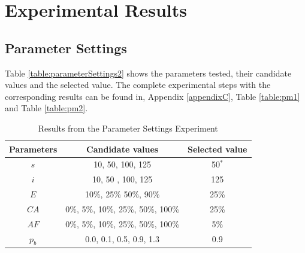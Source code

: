 \section{Experimental Results}
\label{sec:expResults}

\subsection{Parameter Settings}
\label{subsec:parameterSettings_results}

Table \vref{table:parameterSettings2} shows the parameters tested, their candidate values and the selected value. The complete experimental steps with the corresponding results can be found in, Appendix \ref{appendixC}, Table \vref{table:pm1} and Table \vref{table:pm2}. 

    \begin{table}[H]
    \centering
    \begin{tabular}{|c|c||c|}
    \hline
    Parameters & Candidate values & Selected value\\
    \hline
    $s$ & 10, 50, 100, 125 & 50$^*$ \\
    $i$ & 10, 50 , 100, 125 & 125\\
    $E$ & 10\%, 25\% 50\%, 90\% & 25\% \\
    $CA$ & 0\%, 5\%, 10\%, 25\%, 50\%, 100\% & 25\% \\
    $AF$ & 0\%, 5\%, 10\%, 25\%, 50\%, 100\% & 5\% \\
    $p_{b}$ & 0.0, 0.1, 0.5, 0.9, 1.3 & 0.9 \\
    \hline
    \end{tabular}
    \caption {Results from the Parameter Settings Experiment}
    \label{table:parameterSettings2}
    \end{table}
    
